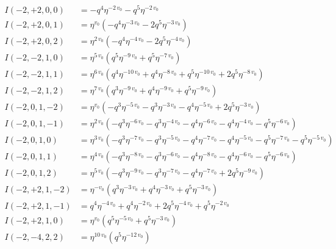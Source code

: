 \documentclass{article}
\begin{document}
\begin{align*}
I(-2, +2, 0, 0) &= -q^{4} \eta^{-2 \, v_{0}} - q^{5} \eta^{-2 \, v_{0}} \\
I(-2, +2, 0, 1) &= \eta^{v_{0}} \left( -q^{4} \eta^{-3 \, v_{0}} - 2 q^{5} \eta^{-3 \, v_{0}} \right) \\
I(-2, +2, 0, 2) &= \eta^{2 \, v_{0}} \left( -q^{4} \eta^{-4 \, v_{0}} - 2 q^{5} \eta^{-4 \, v_{0}} \right) \\
I(-2, -2, 1, 0) &= \eta^{5 \, v_{0}} \left( q^{5} \eta^{-9 \, v_{0}} + q^{5} \eta^{-7 \, v_{0}} \right) \\
I(-2, -2, 1, 1) &= \eta^{6 \, v_{0}} \left( q^{4} \eta^{-10 \, v_{0}} + q^{4} \eta^{-8 \, v_{0}} + q^{5} \eta^{-10 \, v_{0}} + 2 q^{5} \eta^{-8 \, v_{0}} \right) \\
I(-2, -2, 1, 2) &= \eta^{7 \, v_{0}} \left( q^{3} \eta^{-9 \, v_{0}} + q^{4} \eta^{-9 \, v_{0}} + q^{5} \eta^{-9 \, v_{0}} \right) \\
I(-2, 0, 1, -2) &= \eta^{v_{0}} \left( -q^{3} \eta^{-5 \, v_{0}} - q^{3} \eta^{-3 \, v_{0}} - q^{4} \eta^{-5 \, v_{0}} + 2 q^{5} \eta^{-3 \, v_{0}} \right) \\
I(-2, 0, 1, -1) &= \eta^{2 \, v_{0}} \left( -q^{3} \eta^{-6 \, v_{0}} - q^{3} \eta^{-4 \, v_{0}} - q^{4} \eta^{-6 \, v_{0}} - q^{4} \eta^{-4 \, v_{0}} - q^{5} \eta^{-6 \, v_{0}} \right) \\
I(-2, 0, 1, 0) &= \eta^{3 \, v_{0}} \left( -q^{3} \eta^{-7 \, v_{0}} - q^{3} \eta^{-5 \, v_{0}} - q^{4} \eta^{-7 \, v_{0}} - q^{4} \eta^{-5 \, v_{0}} - q^{5} \eta^{-7 \, v_{0}} - q^{5} \eta^{-5 \, v_{0}} \right) \\
I(-2, 0, 1, 1) &= \eta^{4 \, v_{0}} \left( -q^{3} \eta^{-8 \, v_{0}} - q^{3} \eta^{-6 \, v_{0}} - q^{4} \eta^{-8 \, v_{0}} - q^{4} \eta^{-6 \, v_{0}} - q^{5} \eta^{-6 \, v_{0}} \right) \\
I(-2, 0, 1, 2) &= \eta^{5 \, v_{0}} \left( -q^{3} \eta^{-9 \, v_{0}} - q^{3} \eta^{-7 \, v_{0}} - q^{4} \eta^{-7 \, v_{0}} + 2 q^{5} \eta^{-9 \, v_{0}} \right) \\
I(-2, +2, 1, -2) &= \eta^{-v_{0}} \left( q^{3} \eta^{-3 \, v_{0}} + q^{4} \eta^{-3 \, v_{0}} + q^{5} \eta^{-3 \, v_{0}} \right) \\
I(-2, +2, 1, -1) &= q^{4} \eta^{-4 \, v_{0}} + q^{4} \eta^{-2 \, v_{0}} + 2 q^{5} \eta^{-4 \, v_{0}} + q^{5} \eta^{-2 \, v_{0}} \\
I(-2, +2, 1, 0) &= \eta^{v_{0}} \left( q^{5} \eta^{-5 \, v_{0}} + q^{5} \eta^{-3 \, v_{0}} \right) \\
I(-2, -4, 2, 2) &= \eta^{10 \, v_{0}} \left( q^{5} \eta^{-12 \, v_{0}} \right) \\

\end{align*}
\end{document}
